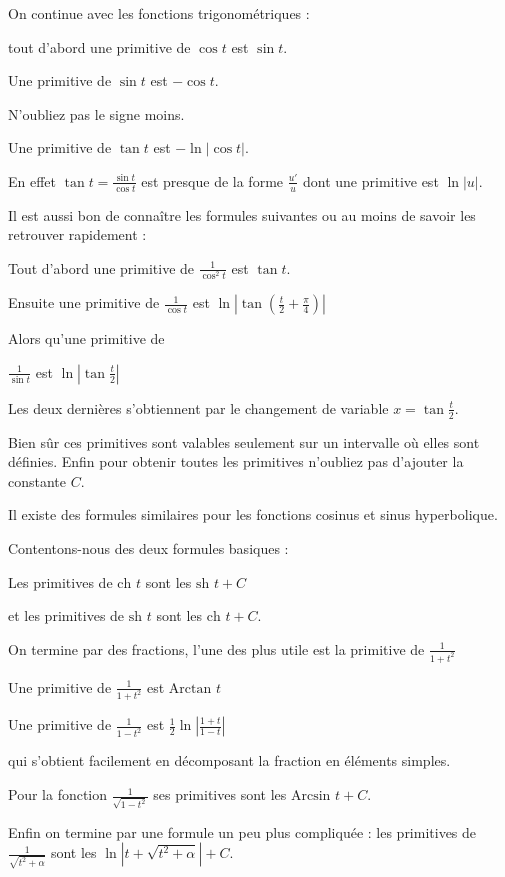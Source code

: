 On continue avec les fonctions trigonométriques :

tout d'abord une primitive de $\cos t$ est $\sin t$.

\change

Une primitive de $\sin t$ est $-\cos t$.

N'oubliez pas le signe moins.

\change

Une primitive de $\tan t$ est $-\ln \left| \cos t \right|$.

En effet $\tan t = \frac{\sin t}{\cos t}$ est presque de la forme $\frac{u'}{u}$
dont une primitive est $\ln|u|$.


\change

Il est aussi bon de connaître les formules suivantes ou au moins de savoir les retrouver rapidement :

Tout d'abord une primitive de $\frac{1}{\cos^2 t}$ est $\tan t$.


\change


Ensuite une primitive de 
$\frac{1}{\cos t}$ est $\ln \left| \tan \left( \frac{t}{2}+\frac{\pi}{4} \right) \right|$


\change

Alors qu'une primitive de 

$\frac{1}{\sin t}$ est $\ln \left| \tan \frac{t}{2} \right|$

Les deux dernières s'obtiennent par le changement de variable $x = \tan \frac t2$.


Bien sûr ces primitives sont valables seulement sur un intervalle 
où elles sont définies.
Enfin pour obtenir toutes les primitives n'oubliez pas d'ajouter la constante $C$.

\diapo

Il existe des formules similaires pour les fonctions cosinus et sinus hyperbolique.

Contentons-nous des deux formules basiques :

Les primitives de $\text{ch } t$ sont les $\text{sh } t +C$

\change

et les primitives de 
$\text{sh } t$ sont les $\text{ch } t +C$.

\diapo


On termine par des fractions, l'une des plus utile est 
la primitive de $\frac{1}{1+t^2}$


Une primitive de $\frac{1}{1+t^2}$ est $\text{Arctan }t$

\change

Une primitive de 
$\frac{1}{1-t^2}$ est $\frac{1}{2}\ln \left| \frac{1+t}{1-t} \right|$

qui s'obtient facilement en décomposant la fraction en éléments simples.

\change

Pour la fonction $\frac{1}{\sqrt{1-t^2}}$ ses primitives sont les $\text{Arcsin }t+C$.


\change

Enfin on termine par une formule un peu plus compliquée :
les primitives de $\frac{1}{\sqrt{t^2+\alpha}}$ sont les 
$\ln \left| t+\sqrt{t^2+\alpha} \right| +C$.

